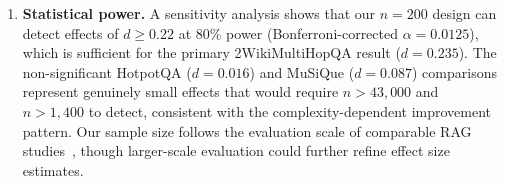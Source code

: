\begin{enumerate}
    \item \textbf{Statistical power.} A sensitivity analysis shows that our $n = 200$ design can detect effects of $d \geq 0.22$ at 80\% power (Bonferroni-corrected $\alpha = 0.0125$), which is sufficient for the primary 2WikiMultiHopQA result ($d = 0.235$).
    The non-significant HotpotQA ($d = 0.016$) and MuSiQue ($d = 0.087$) comparisons represent genuinely small effects that would require $n > 43{,}000$ and $n > 1{,}400$ to detect, consistent with the complexity-dependent improvement pattern.
    Our sample size follows the evaluation scale of comparable RAG studies~\cite{yan2024crag,asai2024selfrag}, though larger-scale evaluation could further refine effect size estimates.
\end{enumerate}

